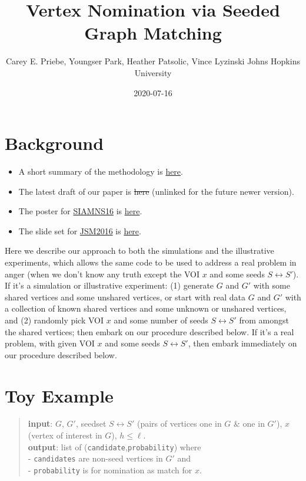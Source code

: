 \documentclass[
]{article}
\title{Vertex Nomination via Seeded Graph Matching}
\author{Carey E. Priebe, Youngser Park, Heather Patsolic, Vince Lyzinski Johns
Hopkins University}
\date{2020-07-16}
\providecommand{\tightlist}{%
  \setlength{\itemsep}{0pt}\setlength{\parskip}{0pt}}
\begin{document}
\maketitle

\hypertarget{background}{%
\section{Background}\label{background}}

\begin{itemize}
\tightlist
\item
  A short summary of the methodology is
  \href{http://www.cis.jhu.edu/~parky/XDATA/SGM/vnsgm_summary.pdf}{here}.
\item
  The latest draft of our paper is \sout{here} (unlinked for the future
  newer version).
\item
  The poster for \href{http://www.siam.org/meetings/ns16/}{SIAMNS16} is
  \href{http://www.cis.jhu.edu/~parky/XDATA/SGM/SIAM-NS16-VNSGM.pdf}{here}.
\item
  The slide set for
  \href{https://www.amstat.org/meetings/jsm/2016/}{JSM2016} is
  \href{http://www.cis.jhu.edu/~parky/XDATA/SGM/JSM2016-VNLNM.pdf}{here}.
\end{itemize}

Here we describe our approach to both the simulations and the
illustrative experiments, which allows the same code to be used to
address a real problem in anger (when we don't know any truth except the
VOI \(x\) and some seeds \(S \leftrightarrow S'\)).\\
If it's a simulation or illustrative experiment: (1) generate \(G\) and
\(G'\) with some shared vertices and some unshared vertices, or start
with real data \(G\) and \(G'\) with a collection of known shared
vertices and some unknown or unshared vertices, and (2) randomly pick
VOI \(x\) and some number of seeds \(S\leftrightarrow S'\) from amongst
the shared vertices; then embark on our procedure described below. If
it's a real problem, with given VOI \(x\) and some seeds
\(S \leftrightarrow S'\), then embark immediately on our procedure
described below.

\hypertarget{toy-example}{%
\section{Toy Example}\label{toy-example}}

\begin{quote}
\textbf{input}: \(G\), \(G'\), seedset \(S\leftrightarrow S'\) (pairs of
vertices one in \(G\) \& one in \(G'\)), \(x\) (vertex of interest in
\(G\)), \(h \leq \ell\).\\
\textbf{output}: list of (\texttt{candidate},\texttt{probability})
where\\
- \texttt{candidates} are non-seed vertices in \(G'\) and\\
- \texttt{probability} is for nomination as match for \(x\).
\end{quote}
\end{document}

